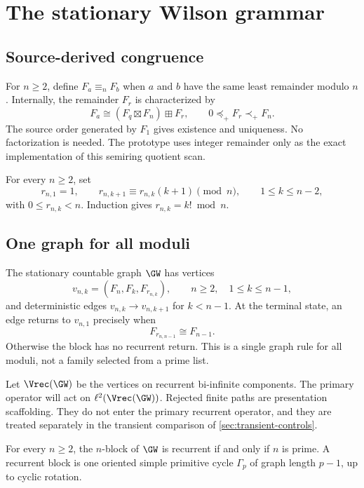 \section{The stationary Wilson grammar}
\label{sec:wilson-grammar}

\subsection{Source-derived congruence}

For $n\geq2$, define $F_a\equiv_nF_b$ when $a$ and $b$ have the same least
remainder modulo $n$.  Internally, the remainder $F_r$ is characterized by
\[
  F_a\cong(F_q\boxtimes F_n)\boxplus F_r,
  \qquad 0\preceq_+F_r\prec_+F_n.
\]
The source order generated by $F_1$ gives existence and uniqueness.  No
factorization is needed.  The prototype uses integer remainder only as the
exact implementation of this semiring quotient scan.

For every $n\geq2$, set
\[
  r_{n,1}=1,
  \qquad
  r_{n,k+1}\equiv r_{n,k}(k+1)\pmod n,
  \qquad1\leq k\leq n-2,
\]
with $0\leq r_{n,k}<n$.  Induction gives $r_{n,k}=k!\bmod n$.

\subsection{One graph for all moduli}

The stationary countable graph $\GW$ has vertices
\[
  v_{n,k}=(F_n,F_k,F_{r_{n,k}}),
  \qquad n\geq2,\quad1\leq k\leq n-1,
\]
and deterministic edges $v_{n,k}\to v_{n,k+1}$ for $k<n-1$.  At the terminal
state, an edge returns to $v_{n,1}$ precisely when
\[
  F_{r_{n,n-1}}\cong F_{n-1}.
\]
Otherwise the block has no recurrent return.  This is a single graph rule for
all moduli, not a family selected from a prime list.

Let $\Vrec(\GW)$ be the vertices on recurrent bi-infinite components.  The
primary operator will act on $\ell^2(\Vrec(\GW))$.  Rejected finite paths are
presentation scaffolding.  They do not enter the primary recurrent operator,
and they are treated separately in the transient comparison of
\cref{sec:transient-controls}.

\begin{theorem}
\label{thm:wilson-cycles}
For every $n\geq2$, the $n$-block of $\GW$ is recurrent if and only if $n$ is
prime.  A recurrent block is one oriented simple primitive cycle $\Gamma_p$
of graph length $p-1$, up to cyclic rotation.
\end{theorem}

